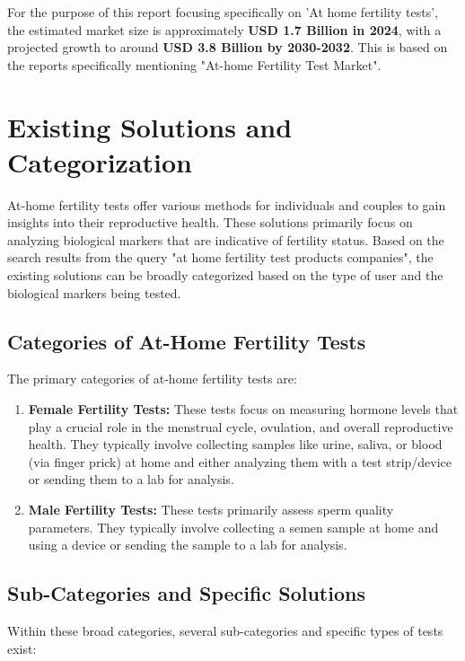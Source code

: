 \documentclass{article}
\begin{document}
For the purpose of this report focusing specifically on 'At home fertility tests', the estimated market size is approximately \textbf{USD 1.7 Billion in 2024}, with a projected growth to around \textbf{USD 3.8 Billion by 2030-2032}. This is based on the reports specifically mentioning "At-home Fertility Test Market".

\section{Existing Solutions and Categorization}

At-home fertility tests offer various methods for individuals and couples to gain insights into their reproductive health. These solutions primarily focus on analyzing biological markers that are indicative of fertility status. Based on the search results from the query "at home fertility test products companies", the existing solutions can be broadly categorized based on the type of user and the biological markers being tested.

\subsection{Categories of At-Home Fertility Tests}

The primary categories of at-home fertility tests are:

\begin{enumerate}
    \item \textbf{Female Fertility Tests:} These tests focus on measuring hormone levels that play a crucial role in the menstrual cycle, ovulation, and overall reproductive health. They typically involve collecting samples like urine, saliva, or blood (via finger prick) at home and either analyzing them with a test strip/device or sending them to a lab for analysis.
    \item \textbf{Male Fertility Tests:} These tests primarily assess sperm quality parameters. They typically involve collecting a semen sample at home and using a device or sending the sample to a lab for analysis.
\end{enumerate}

\subsection{Sub-Categories and Specific Solutions}

Within these broad categories, several sub-categories and specific types of tests exist:
\end{document}
